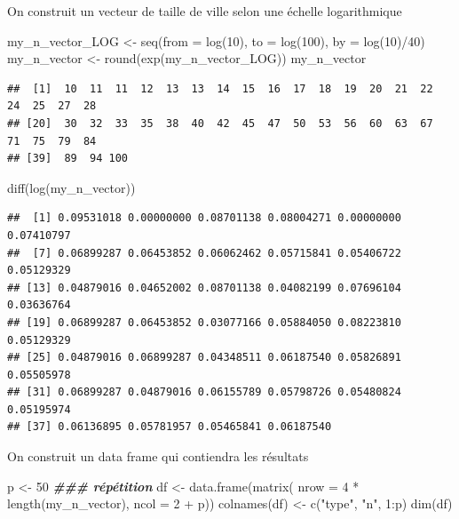 \documentclass[
]{article}
\newenvironment{Shaded}{\begin{snugshade}}{\end{snugshade}}
\newcommand{\AttributeTok}[1]{\textcolor[rgb]{0.77,0.63,0.00}{#1}}
\newcommand{\DecValTok}[1]{\textcolor[rgb]{0.00,0.00,0.81}{#1}}
\newcommand{\DocumentationTok}[1]{\textcolor[rgb]{0.56,0.35,0.01}{\textbf{\textit{#1}}}}
\newcommand{\FunctionTok}[1]{\textcolor[rgb]{0.00,0.00,0.00}{#1}}
\newcommand{\NormalTok}[1]{#1}
\newcommand{\OtherTok}[1]{\textcolor[rgb]{0.56,0.35,0.01}{#1}}
\newcommand{\SpecialCharTok}[1]{\textcolor[rgb]{0.00,0.00,0.00}{#1}}
\newcommand{\StringTok}[1]{\textcolor[rgb]{0.31,0.60,0.02}{#1}}
\begin{document}
On construit un vecteur de taille de ville selon une échelle
logarithmique

\begin{Shaded}
\begin{Highlighting}[]
\NormalTok{my\_n\_vector\_LOG }\OtherTok{\textless{}{-}} \FunctionTok{seq}\NormalTok{(}\AttributeTok{from =} \FunctionTok{log}\NormalTok{(}\DecValTok{10}\NormalTok{), }\AttributeTok{to =} \FunctionTok{log}\NormalTok{(}\DecValTok{100}\NormalTok{), }\AttributeTok{by =} \FunctionTok{log}\NormalTok{(}\DecValTok{10}\NormalTok{)}\SpecialCharTok{/}\DecValTok{40}\NormalTok{)}
\NormalTok{my\_n\_vector }\OtherTok{\textless{}{-}} \FunctionTok{round}\NormalTok{(}\FunctionTok{exp}\NormalTok{(my\_n\_vector\_LOG))}
\NormalTok{my\_n\_vector}
\end{Highlighting}
\end{Shaded}

\begin{verbatim}
##  [1]  10  11  11  12  13  13  14  15  16  17  18  19  20  21  22  24  25  27  28
## [20]  30  32  33  35  38  40  42  45  47  50  53  56  60  63  67  71  75  79  84
## [39]  89  94 100
\end{verbatim}

\begin{Shaded}
\begin{Highlighting}[]
\FunctionTok{diff}\NormalTok{(}\FunctionTok{log}\NormalTok{(my\_n\_vector))}
\end{Highlighting}
\end{Shaded}

\begin{verbatim}
##  [1] 0.09531018 0.00000000 0.08701138 0.08004271 0.00000000 0.07410797
##  [7] 0.06899287 0.06453852 0.06062462 0.05715841 0.05406722 0.05129329
## [13] 0.04879016 0.04652002 0.08701138 0.04082199 0.07696104 0.03636764
## [19] 0.06899287 0.06453852 0.03077166 0.05884050 0.08223810 0.05129329
## [25] 0.04879016 0.06899287 0.04348511 0.06187540 0.05826891 0.05505978
## [31] 0.06899287 0.04879016 0.06155789 0.05798726 0.05480824 0.05195974
## [37] 0.06136895 0.05781957 0.05465841 0.06187540
\end{verbatim}

On construit un data frame qui contiendra les résultats

\begin{Shaded}
\begin{Highlighting}[]
\NormalTok{p }\OtherTok{\textless{}{-}} \DecValTok{50} \DocumentationTok{\#\#\# répétition}
\NormalTok{df }\OtherTok{\textless{}{-}} \FunctionTok{data.frame}\NormalTok{(}\FunctionTok{matrix}\NormalTok{( }\AttributeTok{nrow =} \DecValTok{4} \SpecialCharTok{*} \FunctionTok{length}\NormalTok{(my\_n\_vector), }\AttributeTok{ncol =} \DecValTok{2} \SpecialCharTok{+}\NormalTok{ p))}
\FunctionTok{colnames}\NormalTok{(df) }\OtherTok{\textless{}{-}} \FunctionTok{c}\NormalTok{(}\StringTok{"type"}\NormalTok{, }\StringTok{"n"}\NormalTok{, }\DecValTok{1}\SpecialCharTok{:}\NormalTok{p)}
\FunctionTok{dim}\NormalTok{(df)}
\end{Highlighting}
\end{Shaded}
\end{document}
